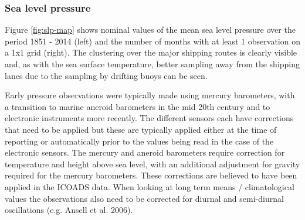 \FloatBarrier
\subsubsection{Sea level pressure}

Figure \ref{fig:slp-map} shows nominal values of the mean sea level pressure over the period 1851 - 2014 (left) and the number of months with at least 1 observation on a 1x1 grid (right).
The clustering over the major shipping routes is clearly visible and, as with the sea surface temperature, better sampling away from the shipping lanes due to the sampling by drifting buoys can be seen.

Early pressure observations were typically made using mercury barometers, with a transition to marine aneroid barometers in the mid 20th century and to electronic instruments more recently. 
The different sensors each have corrections that need to be applied but these are typically applied either at the time of reporting or automatically prior to the values being read in the case of the electronic sensors. 
The mercury and aneroid barometers require correction for temperature and height above sea level, with an additional adjustment for gravity required for the mercury barometers. 
These corrections are believed to have been applied in the ICOADS data.
When looking at long term means / climatological values the observations also need to be corrected for diurnal and semi-diurnal oscillations (e.g. Ansell et al. 2006).



